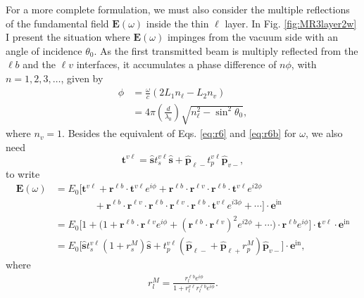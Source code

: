For a more complete formulation, we must also consider the multiple reflections
of the fundamental field $\mathbf{E}(\omega)$ inside the thin $\ell$ layer. In
Fig. \ref{fig:MR3layer2w} I present the situation where $\mathbf{E}(\omega)$
impinges from the vacuum side with an angle of incidence $\theta_{0}$. As the
first transmitted beam is multiply reflected from the $\ell b$ and the $\ell v$
interfaces, it accumulates a phase difference of $n\phi$, with $n=1,2,3,\ldots$,
given by
\begin{equation}\label{mphi}
\begin{split}
\phi &= \frac{\omega}{c}(2L_{1}n_{\ell} - L_{2}n_{v})\nonumber\\
&= 4\pi\left(\frac{d}{\lambda_{0}}\right)\sqrt{n^{2}_\ell-\sin^{2}\theta_{0}},
\end{split}
\end{equation}
where $n_{v}=1$. Besides the equivalent of Eqs. \eqref{eq:r6} and \eqref{eq:r6b}
for $\omega$, we also need
\begin{equation}\label{eq:mvv}
\mathbf{t}^{v\ell}
= \hat{\mathbf{s}}t_{s}^{v\ell}\hat{\mathbf{s}} 
+ \hat{\mathbf{p}}_{\ell -}t_{p}^{v\ell}\hat{\mathbf{p}}_{v-},
\end{equation}
to write
\begin{align}\label{eq:mcvew}
\mathbf{E}(\omega)
&= E_{0}
\Big[
\mathbf{t}^{v\ell} + \mathbf{r}^{\ell b}\cdot\mathbf{t}^{v\ell}e^{i\phi}
 + \mathbf{r}^{\ell b}\cdot\mathbf{r}^{\ell v}\cdot
   \mathbf{r}^{\ell b}\cdot\mathbf{t}^{v\ell} e^{i2\phi}\nonumber\\
&\qquad\qquad+ \mathbf{r}^{\ell b}\cdot\mathbf{r}^{\ell v}\cdot
   \mathbf{r}^{\ell b}\cdot\mathbf{r}^{\ell v}\cdot
   \mathbf{r}^{\ell b}\cdot\mathbf{t}^{v\ell} e^{i3\phi}
 + \cdots
\Big]\cdot\mathbf{e}^{\mathrm{in}}\nonumber\\
&= E_{0}
\Big[
1 + \Big(1 + \mathbf{r}^{\ell b}\cdot\mathbf{r}^{\ell v}e^{i\phi}
+ (\mathbf{r}^{\ell b}\cdot\mathbf{r}^{\ell v})^2e^{i2\phi}+\cdots\Big)\cdot
\mathbf{r}^{\ell b}e^{i\phi}
\Big]
\cdot\mathbf{t}^{v\ell}\cdot\mathbf{e}^{\mathrm{in}}\nonumber\\
&= E_{0}
\Big[
\hat{\mathbf{s}} t^{v\ell}_{s}(1+r^{M}_{s})\hat{\mathbf{s}} 
+ t^{v\ell}_{p}
\left(\hat{\mathbf{p}}_{\ell-}+\hat{\mathbf{p}}_{\ell+}r^{M}_{p}\right)
\hat{\mathbf{p}}_{v-}
\Big]\cdot\mathbf{e}^{\mathrm{in}},
\end{align}
where
\begin{align}\label{mvrm}
r^{M}_{l} =
\frac{r^{\ell b}_{l}e^{i\phi}}
     {1+r^{v\ell}_{l}r^{\ell b}_{l}e^{i\phi}}.
\end{align}
